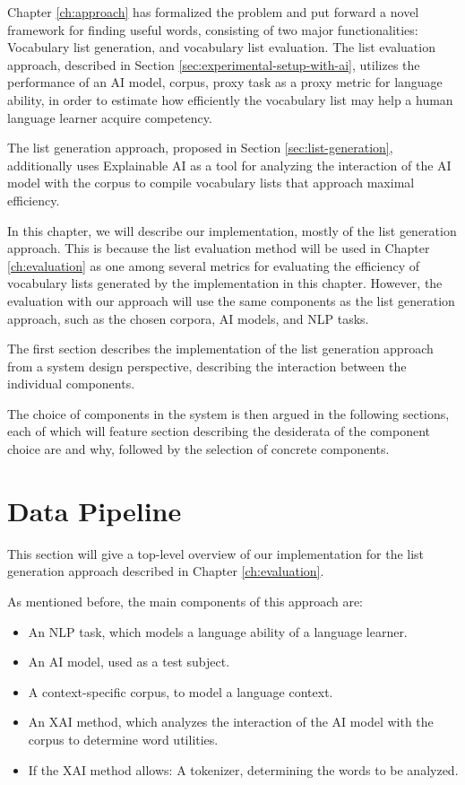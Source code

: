 Chapter \ref{ch:approach} has formalized the problem and put forward a novel framework for finding useful words, consisting of two major functionalities:
Vocabulary list generation, and vocabulary list evaluation.
The list evaluation approach, described in Section \ref{sec:experimental-setup-with-ai}, utilizes the performance of an AI model, corpus, proxy task as a proxy metric for language ability, in order to estimate how efficiently the vocabulary list may help a human language learner acquire competency.

The list generation approach, proposed in Section \ref{sec:list-generation}, additionally uses Explainable AI as a tool for analyzing the interaction of the AI model with the corpus to compile vocabulary lists that approach maximal efficiency.

In this chapter, we will describe our implementation, mostly of the list generation approach.
This is because the list evaluation method will be used in Chapter \ref{ch:evaluation} as one among several metrics for evaluating the efficiency of vocabulary lists generated by the implementation in this chapter.
However, the evaluation with our approach will use the same components as the list generation approach, such as the chosen corpora, AI models, and NLP tasks.

The first section describes the implementation of the list generation approach from a system design perspective, describing the interaction between the individual components.

The choice of components in the system is then argued in the following sections, each of which will feature section describing the desiderata of the component choice are and why, followed by the selection of concrete components.

\section{Data Pipeline}

This section will give a top-level overview of our implementation for the list generation approach described in Chapter \ref{ch:evaluation}.

As mentioned before, the main components of this approach are:

\begin{itemize}
	\item An NLP task, which models a language ability of a language learner.
	\item An AI model, used as a test subject.
	\item A context-specific corpus, to model a language context.
	\item An XAI method, which analyzes the interaction of the AI model with the corpus to determine word utilities.
	\item If the XAI method allows: A tokenizer, determining the words to be analyzed.
\end{itemize}

